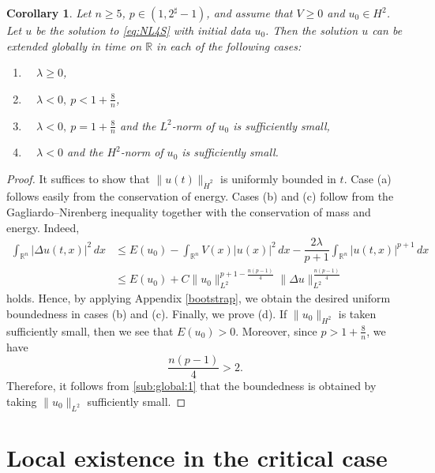 \documentclass[11pt,a4paper]{article}
\numberwithin{equation}{section}
\newtheorem{corollary}[theorem]{Corollary}
\begin{document}
\begin{corollary}
Let $n \geq 5$, $p \in (1, 2^{\sharp} -1)$, and assume that $V \geq 0$ and $u_{0} \in H^{2}$. Let $u$ be the solution to \eqref{eq:NL4S} with initial data $u_{0}$.
Then the solution $u$ can be extended globally in time on $\mathbb{R}$ in each of the following cases:
\begin{enumerate}
\item[(a)] \ \ $\lambda \geq 0$,
\item[(b)] \ \ $\lambda < 0,\ p < 1 + \frac{8}{n}$,
\item[(c)] \ \ $\lambda < 0,\ p = 1 + \frac{8}{n}$ and the $L^{2}$-norm of $u_{0}$ is sufficiently small,
\item[(d)] \ \ $\lambda < 0$ and the $H^{2}$-norm of $u_{0}$ is sufficiently small.
\end{enumerate}
\end{corollary}

\begin{proof}
It suffices to show that $\|u(t)\|_{\dot{H}^{2}}$ is uniformly bounded in $t$.
Case (a) follows easily from the conservation of energy.
Cases (b) and (c) follow from the Gagliardo--Nirenberg inequality together with the conservation of mass and energy.
Indeed,
\begin{equation}\label{sub:global:1}
\begin{aligned}
\int_{\mathbb{R}^{n}}|\Delta u(t, x) |^{2} \, dx
&\leq E(u_{0}) - \int_{\mathbb{R}^{n}} V(x)|u(x)|^{2}\,dx - \dfrac{2\lambda}{p + 1}\int_{\mathbb{R}^{n}}|u(t, x)|^{p + 1}\,dx \\
&\leq E(u_{0}) + C\|u_{0}\|_{L^{2}}^{p + 1 - \frac{n(p-1)}{4}}\|\Delta u\|_{L^{2}}^{\frac{n(p-1)}{4}}
\end{aligned}
\end{equation}
holds. Hence, by applying Appendix \ref{bootstrap}, we obtain the desired uniform boundedness in cases (b) and (c).
Finally, we prove (d).
If $\|u_{0}\|_{H^{2}}$ is taken sufficiently small, then we see that $E(u_{0}) > 0$.
Moreover, since $p > 1 + \frac{8}{n}$, we have
\[
\frac{n(p-1)}{4} > 2.
\]
Therefore, it follows from \eqref{sub:global:1} that the boundedness is obtained by taking $\|u_{0}\|_{L^{2}}$ sufficiently small.
\end{proof}

\section{Local existence in the critical case}
\end{document}
